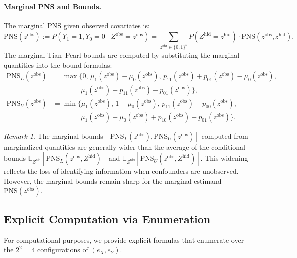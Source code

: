 \documentclass[accepted]{uai2026} %
\theoremstyle{plain}
\theoremstyle{definition}
\theoremstyle{remark}
\newtheorem{remark}[theorem]{Remark}
\begin{document}
\paragraph{Marginal PNS and Bounds.}
The marginal PNS given observed covariates is:
\begin{equation}
\text{PNS}(z^{\text{obs}}) := P(Y_1 = 1, Y_0 = 0 \mid Z^{\text{obs}} = z^{\text{obs}}) = \sum_{z^{\text{hid}} \in \{0,1\}^5} P(Z^{\text{hid}} = z^{\text{hid}}) \cdot \text{PNS}(z^{\text{obs}}, z^{\text{hid}}).
\end{equation}
The marginal Tian--Pearl bounds are computed by substituting the marginal quantities into the bound formulas:
\begin{align}
\text{PNS}_L(z^{\text{obs}}) &= \max\Big\{0,\, \mu_1(z^{\text{obs}}) - \mu_0(z^{\text{obs}}),\, p_{11}(z^{\text{obs}}) + p_{01}(z^{\text{obs}}) - \mu_0(z^{\text{obs}}), \nonumber \\
&\qquad\qquad \mu_1(z^{\text{obs}}) - p_{11}(z^{\text{obs}}) - p_{01}(z^{\text{obs}})\Big\}, \\
\text{PNS}_U(z^{\text{obs}}) &= \min\Big\{\mu_1(z^{\text{obs}}),\, 1 - \mu_0(z^{\text{obs}}),\, p_{11}(z^{\text{obs}}) + p_{00}(z^{\text{obs}}), \nonumber \\
&\qquad\qquad \mu_1(z^{\text{obs}}) - \mu_0(z^{\text{obs}}) + p_{10}(z^{\text{obs}}) + p_{01}(z^{\text{obs}})\Big\}.
\end{align}

\begin{remark}
The marginal bounds $[\text{PNS}_L(z^{\text{obs}}), \text{PNS}_U(z^{\text{obs}})]$ computed from marginalized quantities are generally wider than the average of the conditional bounds $\mathbb{E}_{Z^{\text{hid}}}[\text{PNS}_L(z^{\text{obs}}, Z^{\text{hid}})]$ and $\mathbb{E}_{Z^{\text{hid}}}[\text{PNS}_U(z^{\text{obs}}, Z^{\text{hid}})]$. This widening reflects the loss of identifying information when confounders are unobserved. However, the marginal bounds remain sharp for the marginal estimand $\text{PNS}(z^{\text{obs}})$.
\end{remark}


\subsection{Explicit Computation via Enumeration}
\label{app:dgp:enumeration}

For computational purposes, we provide explicit formulas that enumerate over the $2^2 = 4$ configurations of $(e_X, e_Y)$.
\end{document}
